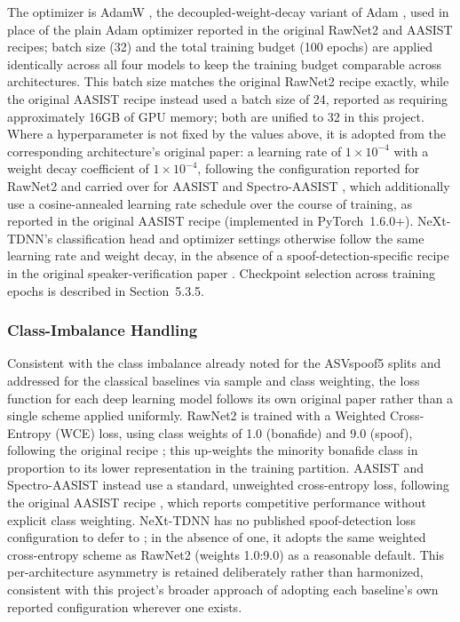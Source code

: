 The optimizer is AdamW \cite{Loshchilov2019_adamw}, the decoupled-weight-decay variant of Adam \cite{Kingma2015_adam}, used in place of the plain Adam optimizer reported in the original RawNet2 and AASIST recipes; batch size (32) and the total training budget (100 epochs) are applied identically across all four models to keep the training budget comparable across architectures. This batch size matches the original RawNet2 recipe exactly, while the original AASIST recipe instead used a batch size of 24, reported as requiring approximately 16GB of GPU memory; both are unified to 32 in this project. Where a hyperparameter is not fixed by the values above, it is adopted from the corresponding architecture's original paper: a learning rate of $1\times10^{-4}$ with a weight decay coefficient of $1\times10^{-4}$, following the configuration reported for RawNet2 \cite{Tak2021_rawnet2} and carried over for AASIST and Spectro-AASIST \cite{Jung2022_aasist}, which additionally use a cosine-annealed learning rate schedule over the course of training, as reported in the original AASIST recipe (implemented in PyTorch~1.6.0+). NeXt-TDNN's classification head and optimizer settings otherwise follow the same learning rate and weight decay, in the absence of a spoof-detection-specific recipe in the original speaker-verification paper \cite{Heo2024_nexttdnn}. Checkpoint selection across training epochs is described in Section~5.3.5.

\subsubsection{Class-Imbalance Handling}

Consistent with the class imbalance already noted for the ASVspoof5 splits and addressed for the classical baselines via sample and class weighting, the loss function for each deep learning model follows its own original paper rather than a single scheme applied uniformly. RawNet2 is trained with a Weighted Cross-Entropy (WCE) loss, using class weights of 1.0 (bonafide) and 9.0 (spoof), following the original recipe \cite{Tak2021_rawnet2}; this up-weights the minority bonafide class in proportion to its lower representation in the training partition. AASIST and Spectro-AASIST instead use a standard, unweighted cross-entropy loss, following the original AASIST recipe \cite{Jung2022_aasist}, which reports competitive performance without explicit class weighting. NeXt-TDNN has no published spoof-detection loss configuration to defer to \cite{Heo2024_nexttdnn}; in the absence of one, it adopts the same weighted cross-entropy scheme as RawNet2 (weights 1.0:9.0) as a reasonable default. This per-architecture asymmetry is retained deliberately rather than harmonized, consistent with this project's broader approach of adopting each baseline's own reported configuration wherever one exists.

